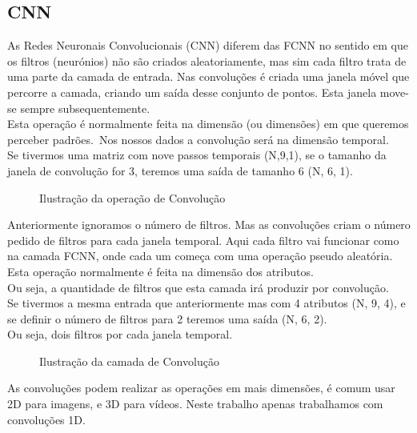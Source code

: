 \subsection{CNN\label{se:cnn_sec}}
As Redes Neuronais Convolucionais (\gls{CNN}) diferem das \gls{FCNN} no sentido em que os filtros (neurónios) não são criados aleatoriamente, mas sim cada filtro trata de uma parte da camada de entrada. Nas convoluções é criada uma janela móvel que percorre a camada, criando um saída desse conjunto de pontos. Esta janela move-se sempre subsequentemente.\\
Esta operação é normalmente feita na dimensão (ou dimensões) em que queremos perceber padrões.\
Nos nossos dados a convolução será na dimensão temporal.\\
Se tivermos uma matriz com nove passos temporais (N,9,1), se o tamanho da janela de convolução for 3, teremos uma saída de tamanho 6 (N, 6, 1).\\
\begin{figure}[H]
	\centering
	\resizebox{\linewidth}{!}{}
	\caption{Ilustração da operação de Convolução}
	\label{fig:conv_layer1D}
\end{figure}

Anteriormente ignoramos o número de filtros. Mas as convoluções criam o número pedido de filtros para cada janela temporal. Aqui cada filtro vai funcionar como na camada \gls{FCNN}, onde cada um começa com uma operação pseudo aleatória. Esta operação normalmente é feita na dimensão dos atributos.\\
Ou seja, a quantidade de filtros que esta camada irá produzir por convolução.\\
Se tivermos a mesma entrada que anteriormente mas com 4 atributos (N, 9, 4), e se definir o número de filtros para 2 teremos uma saída (N, 6, 2).\\
Ou seja, dois filtros por cada janela temporal.\\


\begin{figure}[H]
	\centering
	\resizebox{\linewidth}{!}{}
	\caption{Ilustração da camada de Convolução}
	\label{fig:conv_layer}
\end{figure}

As convoluções podem realizar as operações em mais dimensões, é comum usar 2D para imagens, e 3D para vídeos. Neste trabalho apenas trabalhamos com convoluções 1D.\\

